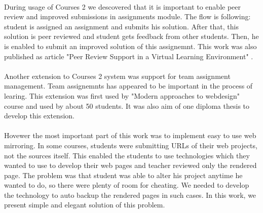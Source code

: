 \paragraph{}
During usage of Courses 2 we descovered that it is important to enable peer review and improved submissions in assignments module. The flow is following: student is assigned an assignment and submits his solution. After that, this solution is peer reviewed and student gets feedback from other students. Then, he is enabled to submit an improved solution of this assignemnt. This work was also published as article "Peer Review Support in a Virtual Learning Environment"  \cite{homola2016peer}.

\paragraph{}
Another extension to Courses 2 system was support for team assignment management. Team assignemnts has appeared to be important in the process of learing. This extension was first used by "Modern approaches to webdesign" course and used by about 50 students. It was also aim of one diploma thesis to develop this extension.

\paragraph{}
Hovewer the most important part of this work was to implement easy to use web mirroring. In some courses, students were submitting URLs of their web projects, not the sources itself. This enabled the students to use technologies which they wanted to use to develop their web pages and teacher reviewed only the rendered page. The problem was that student was able to alter his project anytime he wanted to do, so there were plenty of room for cheating. We needed to develop the technology to auto backup the rendered pages in such cases. In this work, we present simple and elegant solution of this problem.
